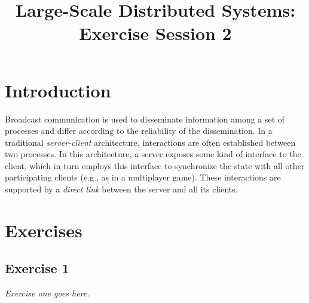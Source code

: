 

\title{Large-Scale Distributed Systems: Exercise Session 2}
\maketitle

\section{Introduction}
\label{sec:introduction}

Broadcast communication is used to disseminate information among a set of processes and differ according to the reliability of the dissemination.  In a traditional \emph{server-client} architecture, interactions are often established between two processes. In this architecture, a server exposes some kind of interface to the client, which in turn employs this interface to synchronize the state with all other participating clients (e.g., as in a multiplayer game). These interactions are supported by a \emph{direct link} between the server and all its clients.

\section{Exercises}
\label{sec:exercises}

\subsection*{Exercise 1}
\label{sec:exercise_1}

\emph{Exercise one goes here.}


